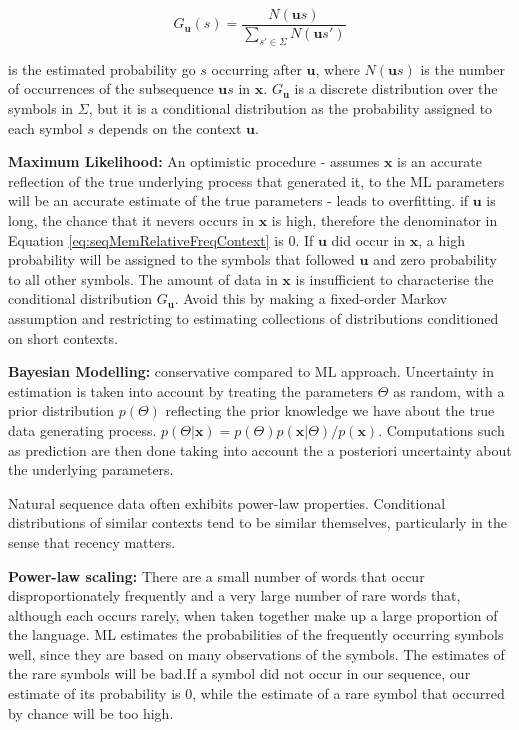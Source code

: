 \begin{equation}
G_{\boldsymbol{u}}(s)=\frac{N(\boldsymbol{u}s)}{\sum_{s' \in \Sigma}N(\boldsymbol{u}s')}
\label{eq:seqMemRelativeFreqContext}
\end{equation}

\noindent is the estimated probability go $s$ occurring after $\boldsymbol{u}$, where $N(\boldsymbol{u}s)$ is the number of occurrences of the subsequence $\boldsymbol{u}s$ in $\boldsymbol{x}$. $G_{\boldsymbol{u}}$ is a discrete distribution over the symbols in $\Sigma$, but it is a conditional distribution as the probability assigned to each symbol $s$ depends on the context $\boldsymbol{u}$.

\textbf{Maximum Likelihood:} An optimistic procedure - assumes $\boldsymbol{x}$ is an accurate reflection of the true underlying process that generated it, to the ML parameters will be an accurate estimate of the true parameters - leads to overfitting. if $\boldsymbol{u}$ is long, the chance that it nevers occurs in $\boldsymbol{x}$ is high, therefore the denominator in Equation \ref{eq:seqMemRelativeFreqContext} is 0. If $\boldsymbol{u}$ did occur in $\boldsymbol{x}$, a high probability will be assigned to the symbols that followed $\boldsymbol{u}$ and zero probability to all other symbols. The amount of data in $\boldsymbol{x}$ is insufficient to characterise the conditional distribution $G_{\boldsymbol{u}}$. Avoid this by making a fixed-order Markov assumption and restricting to estimating collections of distributions conditioned on short contexts.

\textbf{Bayesian Modelling:} conservative compared to ML approach. Uncertainty in estimation is taken into account by treating the parameters $\Theta$ as random, with a prior distribution $p(\Theta)$ reflecting the prior knowledge we have about the true data generating process. $p(\Theta | \boldsymbol{x})=p(\Theta)p(\boldsymbol{x}|\Theta)/p(\boldsymbol{x})$. Computations such as prediction are then done taking into account the a posteriori uncertainty about the underlying parameters.

Natural sequence data often exhibits power-law properties. Conditional distributions of similar contexts tend to be similar themselves, particularly in the sense that recency matters.

\textbf{Power-law scaling:} There are a small number of words that occur disproportionately frequently and a very large number of rare words that, although each occurs rarely, when taken together make up a large proportion of the language. ML estimates the probabilities of the frequently occurring symbols well, since they are based on many observations of the symbols. The estimates of the rare symbols will be bad.If a symbol did not occur in our sequence, our estimate of its probability is 0, while the estimate of a rare symbol that occurred by chance will be too high.


